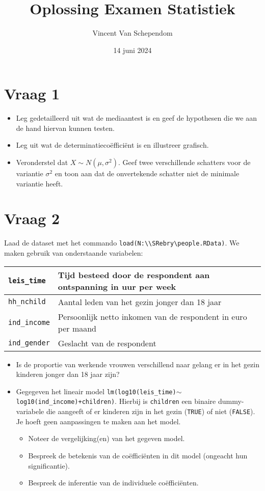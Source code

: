 \documentclass[kulak]{kulakarticle} %
\title{Oplossing Examen Statistiek}
\author{Vincent Van Schependom}
\date{14 juni 2024}
\begin{document}
\maketitle

\section*{Vraag 1}

\begin{itemize}
	\item Leg gedetailleerd uit wat de mediaantest is en geef de hypothesen die we aan de hand hiervan kunnen testen.
	\item Leg uit wat de determinatiecoëfficiënt is en illustreer grafisch.
	\item Veronderstel dat \(X \sim N(\mu,\sigma^2)\). Geef twee verschillende schatters voor de variantie \(\sigma^2\) en toon aan dat de onvertekende schatter niet de minimale variantie heeft.
\end{itemize}

\section*{Vraag 2}

Laad de dataset met het commando \texttt{load(N:\textbackslash\textbackslash SRebry\textbackslash people.RData)}. We maken gebruik van onderstaande variabelen:
\begin{center}
\begin{tabular}{l|p{5cm}}
	\texttt{leis\_time} & Tijd besteed door de respondent aan ontspanning in uur per week \\
	\hline
	\texttt{hh\_nchild}        & Aantal leden van het gezin jonger dan 18 jaar \\
	\hline
	\texttt{ind\_income}       & Persoonlijk netto inkomen van de respondent in euro per maand \\
	\hline
	\texttt{ind\_gender}       & Geslacht van de respondent
\end{tabular}
\end{center}
\begin{itemize}
	\item Is de proportie van werkende vrouwen verschillend naar gelang er in het gezin kinderen jonger dan 18 jaar zijn?
	\item Gegegeven het lineair model \texttt{lm(log10(leis\_time)\(\sim\)log10(ind\_income)+children)}. Hierbij is \texttt{children} een binaire dummy-variabele die aangeeft of er kinderen zijn in het gezin (\texttt{TRUE}) of niet (\texttt{FALSE}). Je hoeft geen aanpassingen te maken aan het model.
	\begin{itemize}
		\item Noteer de vergelijking(en) van het gegeven model.
		\item Bespreek de betekenis van de coëfficiënten in dit model (ongeacht hun significantie).
		\item Bespreek de inferentie van de individuele coëfficiënten.
	\end{itemize}
\end{itemize}
\end{document}

